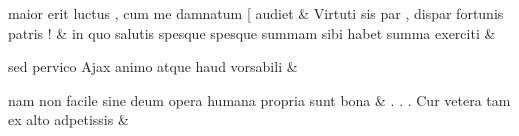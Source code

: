 \documentclass[12pt,onecolumn,twoside,a4paper]{memoir}
\begin{document}
\begin{pairs}
\begin{Leftside}
                              maior
                              erit
                              luctus
                              ,
                              cum
                              me
                              damnatum
                              [
                              audiet \&
                         \stanza {}
                     Virtuti
                              sis
                              par
                              ,
                              dispar
                              fortunis
                              patris
                              ! \&
                         \stanza {}
                     in
                              quo
                              salutis
                              spesque
                              {spesque}
                              summam
                              sibi
                              habet
                              summa
                              exerciti \&
                         \stanza {}
                     
                              sed
                              pervico
                              Ajax
                              animo
                              atque
                              haud
                              vorsabili \&
                         \stanza {}
                     
                              nam
                              non
                              facile
                              sine
                              deum
                              opera
                              humana
                              propria
                              sunt
                              bona \&
                         \stanza {}
                              .
                              .
                              .
                              Cur
                              vetera
                              tam
                              ex
                              alto
                              adpetissis & 
                     

\end{Leftside}
\end{pairs}
\end{document}
